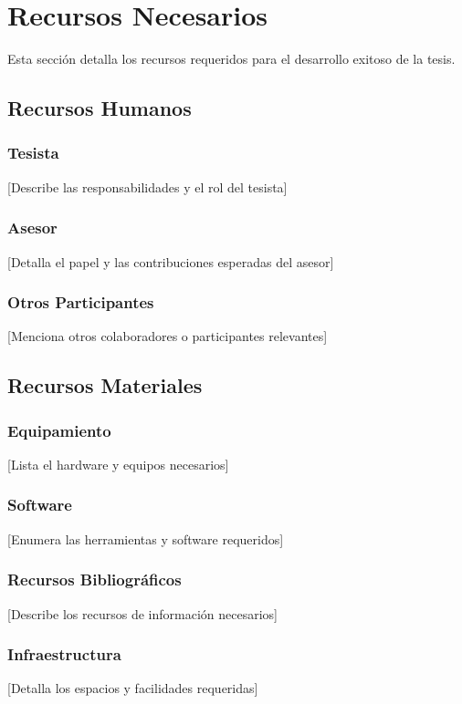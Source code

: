 \section{Recursos Necesarios}

Esta sección detalla los recursos requeridos para el desarrollo exitoso de la tesis.

\subsection{Recursos Humanos}
\subsubsection{Tesista}
[Describe las responsabilidades y el rol del tesista]

\subsubsection{Asesor}
[Detalla el papel y las contribuciones esperadas del asesor]

\subsubsection{Otros Participantes}
[Menciona otros colaboradores o participantes relevantes]

\subsection{Recursos Materiales}
\subsubsection{Equipamiento}
[Lista el hardware y equipos necesarios]

\subsubsection{Software}
[Enumera las herramientas y software requeridos]

\subsubsection{Recursos Bibliográficos}
[Describe los recursos de información necesarios]

\subsubsection{Infraestructura}
[Detalla los espacios y facilidades requeridas]